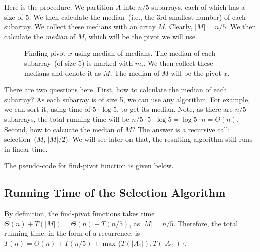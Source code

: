Here is the procedure. We partition $A$ into $n/5$ subarrays, each of which has a size of 5.
We then calculate the median~(i.e., the 3rd smallest number) of each subarray. We collect these medians
with an array $M$. Clearly, $|M| = n/5$. We then calculate the \emph{median} of $M$, which will be the pivot we will use.

\begin{figure}[h!]
\centering{}
\caption{Finding pivot $x$ using median of medians. The median of each subarray~(of size 5) is marked with $m_i$.
We then collect these medians and denote it as $M$. The median of $M$ will be the pivot $x$.}
\label{fig:median}
\end{figure}

There are two questions here. First, how to calculate the median of each subarray?
As each subarray is of size 5, we can use any algorithm. For example, we can sort it, using time of $5 \cdot \log 5$, to get its median.
Note, as there are $n/5$ subarrays, the total running time will be $n/5\cdot 5\cdot \log 5 = \log 5\cdot n = \Theta(n)$.
Second, how to calcuate the median of $M$? The answer is a recursive call: selection~($M$, $|M|/2$).
We will see later on that, the resulting algorithm still runs in linear time.

The pseudo-code for find-pivot function is given below.

\begin{algorithmblock}[0.8\textwidth]
	\xxx
	\aab {\textcolor{blue}{if $|A| < 5$: find~(e.g., by sorting $A$) and return the median of $A$;}}\xxx
	\xxx
	\xxx
	\xxx
	\xxx
\end{algorithmblock}

\subsection*{Running Time of the Selection Algorithm}

By definition, the find-pivot functions takes time $\Theta(n) + T(|M|) = \Theta(n) + T(n/5)$,
as $|M| = n/5$. %
Therefore, the total running time, in the form of a recurrence,
is $T(n) = \Theta(n) + T(n/5) + \max\{T(|A_1|), T(|A_2|)\}$.

